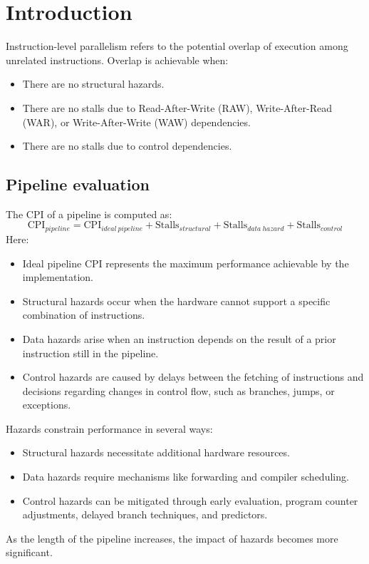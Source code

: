 \section{Introduction}

Instruction-level parallelism refers to the potential overlap of execution among unrelated instructions.
Overlap is achievable when:
\begin{itemize}
    \item There are no structural hazards.
    \item There are no stalls due to Read-After-Write (RAW), Write-After-Read (WAR), or Write-After-Write (WAW) dependencies.
    \item There are no stalls due to control dependencies.
\end{itemize}

\subsection{Pipeline evaluation}
The CPI of a pipeline is computed as: 
\[\text{CPI}_{pipeline}=\text{CPI}_{ideal\:pipeline} + \text{Stalls}_{structural} + \text{Stalls}_{data\:hazard} + \text{Stalls}_{control}\]
Here: 
\begin{itemize}
    \item Ideal pipeline CPI represents the maximum performance achievable by the implementation.
    \item Structural hazards occur when the hardware cannot support a specific combination of instructions.
    \item Data hazards arise when an instruction depends on the result of a prior instruction still in the pipeline.
    \item Control hazards are caused by delays between the fetching of instructions and decisions regarding changes in control flow, such as branches, jumps, or exceptions.
\end{itemize}
Hazards constrain performance in several ways:
\begin{itemize}
    \item Structural hazards necessitate additional hardware resources.
    \item Data hazards require mechanisms like forwarding and compiler scheduling.
    \item Control hazards can be mitigated through early evaluation, program counter adjustments, delayed branch techniques, and predictors.
\end{itemize}
As the length of the pipeline increases, the impact of hazards becomes more significant.

